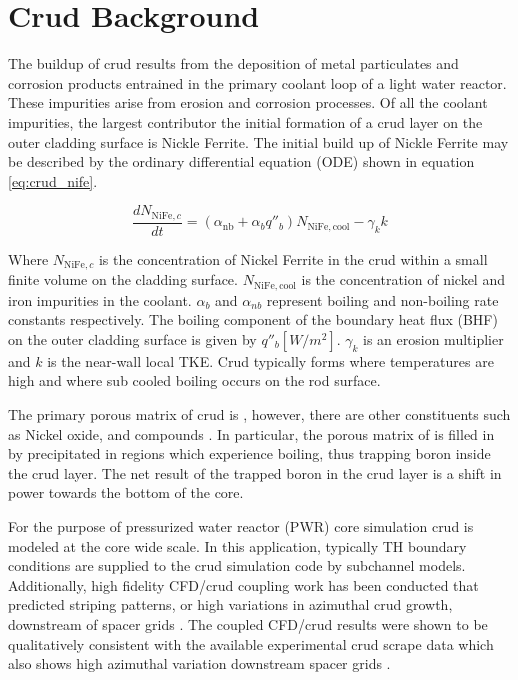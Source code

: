 \section{Crud Background}

The buildup of crud results from the deposition of metal particulates and corrosion products entrained in the primary coolant loop of a light water reactor.  These impurities arise from erosion and corrosion processes.  Of all the coolant impurities, the largest contributor the initial formation of a crud layer on the outer cladding surface is Nickle Ferrite.  The initial build up of Nickle Ferrite may be described by the ordinary differential equation (ODE) shown in equation \ref{eq:crud_nife}.

\begin{equation}
\frac{d N_{\mathrm{NiFe},c}}{dt} = (\alpha_{\mathrm{nb}} + \alpha_{b}q''_{b} )N_{\mathrm{NiFe}, \mathrm{cool}} - \gamma_k k
\label{eq:crud_nife}
\end{equation}

Where $N_{\mathrm{NiFe},c}$ is the concentration of Nickel Ferrite in the crud within a small finite volume on the cladding surface.  $N_{\mathrm{NiFe}, \mathrm{cool}}$ is the concentration of nickel and iron impurities in the coolant.  $\alpha_b$ and $\alpha_{nb}$ represent boiling and non-boiling rate constants respectively.  The boiling component of the boundary heat flux (BHF) on the outer cladding surface is given by $q''_b [W/m^2]$. $\gamma_k$ is an erosion multiplier and $k$ is the near-wall local TKE.  Crud typically forms where temperatures are high and where sub cooled boiling occurs on the rod surface.

The primary porous matrix of crud is , however, there are other constituents such as Nickel oxide,  and  compounds \cite{Henshaw2006TheCO} \cite{mongoose17}. In particular, the porous matrix of  is filled in by precipitated  in regions which experience boiling, thus trapping boron inside the crud layer.  The net result of the trapped boron in the crud layer is a shift in power towards the bottom of the core.

For the purpose of pressurized water reactor (PWR) core simulation crud is modeled at the core wide scale.  In this application, typically TH boundary conditions are supplied to the crud simulation code by subchannel models.  Additionally, high fidelity CFD/crud coupling work has been conducted that predicted striping patterns, or high variations in azimuthal crud growth, downstream of spacer grids \cite{slattery16}.  The coupled CFD/crud results were shown to be qualitatively consistent with the available experimental crud scrape data which also shows high azimuthal variation downstream spacer grids \cite{kendrick13}.

